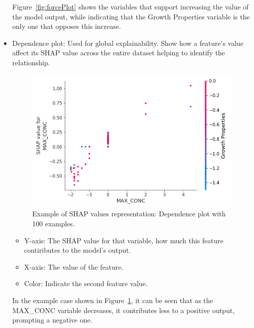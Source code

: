 \begin{itemize}
    Figure~\ref{fig:forcePlot} shows the variables that support increasing the value of the model output, while indicating that the Growth Properties variable is the only one that opposes this increase.

    \item Dependence plot: Used for global explainability. Show how a feature's value affect its SHAP value across the entire dataset helping to identify the relationship.
    \begin{figure}[H]
        \centering
        \includegraphics[width=1\textwidth]{figures/shap/depence_plot.png}
        \caption{Example of SHAP values representation: Dependence plot with 100 examples.}
        \label{fig:dependecePlot}
    \end{figure}

    \begin{itemize}
        \item Y-axis: The SHAP value for that variable, how much this feature contiributes to the model's output.
        \item X-axis: The value of the feature.
        \item Color: Indicate the second feature value.
    \end{itemize}

    In the example case shown in Figure~\ref{fig:dependecePlot}, it can be seen that as the MAX\_CONC variable decreases, it contributes less to a positive output, prompting a negative one.
\end{itemize}

